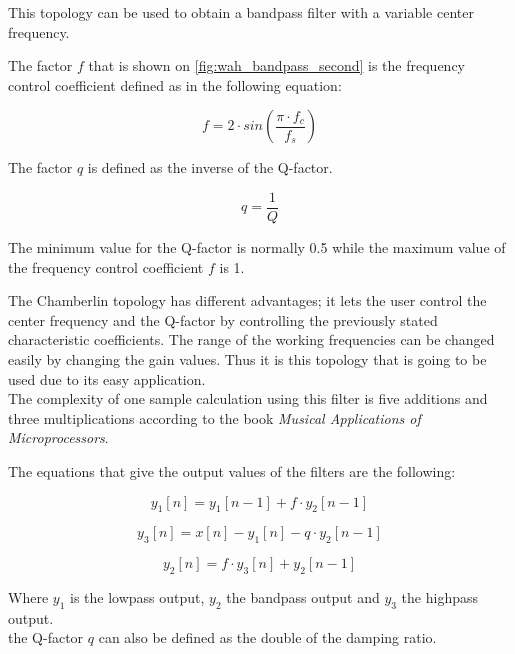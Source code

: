 This topology can be used to obtain a bandpass filter with a variable center frequency. 

The factor $f$ that is shown on \autoref{fig:wah_bandpass_second} is the frequency control coefficient defined as in the following equation:

\begin{equation}
      f = 2 \cdot sin(\frac{\pi \cdot f_{c}}{f_{s}})
\end{equation}

The factor $q$ is defined as the inverse of the Q-factor.

\begin{equation}
			q = \frac{1}{Q}
\end{equation}

The minimum value for the Q-factor is normally 0.5 while the maximum value of the frequency control coefficient $f$ is 1. 

The Chamberlin topology has different advantages; it lets the user control the center frequency and the Q-factor by controlling the previously stated characteristic coefficients. The range of the working frequencies can be changed easily by changing the gain values. Thus it is this topology that is going to be used due to its easy application. \\

The complexity of one sample calculation using this filter is five additions and three multiplications according to the book \textit{Musical Applications of Microprocessors}. 

The equations that give the output values of the filters are the following:

\begin{equation}
   			y_{1}[n] = y_{1}[n-1] + f \cdot y_{2}[n-1]
\end{equation}

\begin{equation}
            y_{3}[n] = x[n]  - y_{1}[n]   - q \cdot y_{2}[n-1]
\end{equation}

\begin{equation}
           y_{2}[n] = f \cdot y_{3}[n] + y_{2}[n-1]
\end{equation}

Where $y_{1}$ is the lowpass output, $y_{2}$ the bandpass output and $y_{3}$ the highpass output. \\
the Q-factor $q$ can also be defined as the double of the damping ratio. \\


